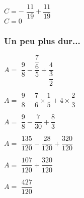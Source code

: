 $ C = - ${  $\dfrac{11}{19} + \dfrac{11}{19} $ }\\

$ C = 0 $ \\

\newpage

\subsubsection{Un peu plus dur...}

\begin{minipage}{0.29\textwidth}
$ A = ${  $\dfrac{9}{8} - \dfrac{\dfrac{7}{6}}{5} + \dfrac{4}{\dfrac{3}{2}} $ }\\

\vspace{.5cm}

$ A = ${  $\dfrac{9}{8} - \dfrac{7}{6} \times \dfrac{1}{5} + 4 \times \dfrac{2}{3} $} \\

\vspace{.5cm}

$ A = ${  $\dfrac{9}{8} - \dfrac{7}{30} + \dfrac{8}{3} $ }\\

\vspace{.5cm}

$ A = ${  $\dfrac{135}{120} - \dfrac{28}{120} + \dfrac{320}{120} $} \\

\vspace{.5cm}

$ A = ${  $\dfrac{107}{120} + \dfrac{320}{120} $ }\\

\vspace{.5cm}

$ A = ${  $\dfrac{427}{120} $ }
\end{minipage}
